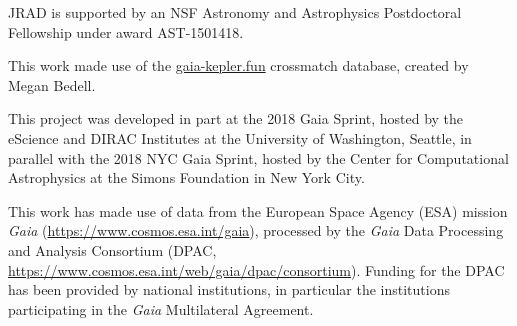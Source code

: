 \documentclass[preprint2]{aastex62}
\begin{document}
JRAD is supported by an NSF Astronomy and Astrophysics Postdoctoral Fellowship under award AST-1501418. 

This work made use of the \url{gaia-kepler.fun} crossmatch database, created by Megan Bedell.

This project was developed in part at the 2018 Gaia Sprint, hosted by the eScience and DIRAC Institutes at the University of Washington, Seattle, in parallel with the 2018 NYC Gaia Sprint, hosted by the Center for Computational Astrophysics at the Simons Foundation in New York City.

This work has made use of data from the European Space Agency (ESA) mission
{\it Gaia} (\url{https://www.cosmos.esa.int/gaia}), processed by the {\it Gaia}
Data Processing and Analysis Consortium (DPAC,
\url{https://www.cosmos.esa.int/web/gaia/dpac/consortium}). Funding for the DPAC
has been provided by national institutions, in particular the institutions
participating in the {\it Gaia} Multilateral Agreement.





\end{document}
